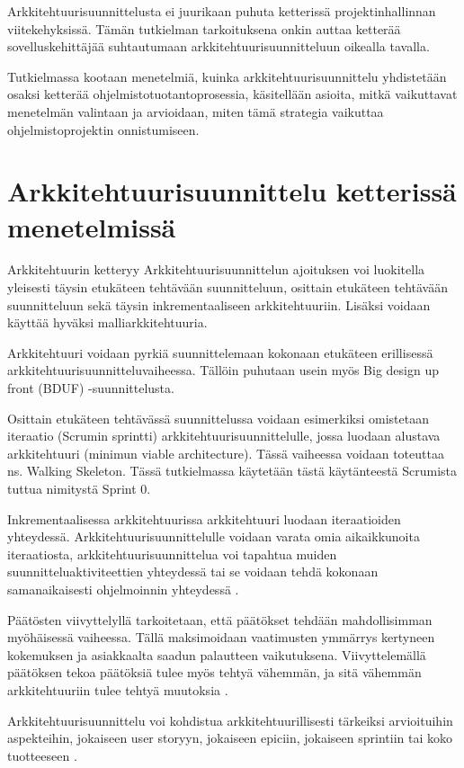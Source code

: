Arkkitehtuurisuunnittelusta ei juurikaan puhuta ketterissä projektinhallinnan viitekehyksissä. Tämän tutkielman tarkoituksena onkin auttaa ketterää sovelluskehittäjää suhtautumaan arkkitehtuurisuunnitteluun oikealla tavalla.

Tutkielmassa kootaan menetelmiä, kuinka arkkitehtuurisuunnittelu yhdistetään osaksi ketterää ohjelmistotuotantoprosessia, käsitellään asioita, mitkä vaikuttavat menetelmän valintaan ja arvioidaan, miten tämä strategia vaikuttaa ohjelmistoprojektin onnistumiseen.
\chapter{Arkkitehtuurisuunnittelu ketterissä menetelmissä}

Arkkitehtuurin ketteryy
Arkkitehtuurisuunnittelun ajoituksen voi luokitella yleisesti täysin etukäteen tehtävään suunnitteluun, osittain etukäteen tehtävään suunnitteluun sekä täysin inkrementaaliseen arkkitehtuuriin. Lisäksi voidaan käyttää hyväksi malliarkkitehtuuria.

Arkkitehtuuri voidaan pyrkiä suunnittelemaan kokonaan etukäteen erillisessä arkkitehtuurisuunnitteluvaiheessa. Tällöin puhutaan usein myös Big design up front (BDUF) -suunnittelusta. 

Osittain etukäteen tehtävässä suunnittelussa voidaan esimerkiksi omistetaan iteraatio (Scrumin sprintti) arkkitehtuurisuunnittelulle, jossa luodaan alustava arkkitehtuuri (minimun viable architecture). Tässä vaiheessa voidaan toteuttaa ns. Walking Skeleton. Tässä tutkielmassa käytetään tästä käytänteestä Scrumista tuttua nimitystä
Sprint 0.

Inkrementaalisessa arkkitehtuurissa arkkitehtuuri luodaan iteraatioiden yhteydessä. Arkkitehtuurisuunnittelulle voidaan varata omia aikaikkunoita iteraatiosta, arkkitehtuurisuunnittelua voi tapahtua muiden suunnitteluaktiviteettien yhteydessä tai se voidaan tehdä kokonaan samanaikaisesti ohjelmoinnin yhteydessä \citep{rost_distilling_2015}. 

Päätösten viivyttelyllä tarkoitetaan, että päätökset tehdään mahdollisimman myöhäisessä vaiheessa. Tällä maksimoidaan vaatimusten ymmärrys kertyneen kokemuksen ja asiakkaalta saadun palautteen vaikutuksena. Viivyttelemällä päätöksen tekoa päätöksiä tulee myös tehtyä vähemmän, ja sitä vähemmän arkkitehtuuriin tulee tehtyä muutoksia \citep{waterman_agility_2018_a}.

Arkkitehtuurisuunnittelu voi kohdistua arkkitehtuurillisesti tärkeiksi arvioituihin  aspekteihin, jokaiseen user storyyn, jokaiseen epiciin, jokaiseen sprintiin tai koko tuotteeseen \citep{rost_distilling_2015}.

